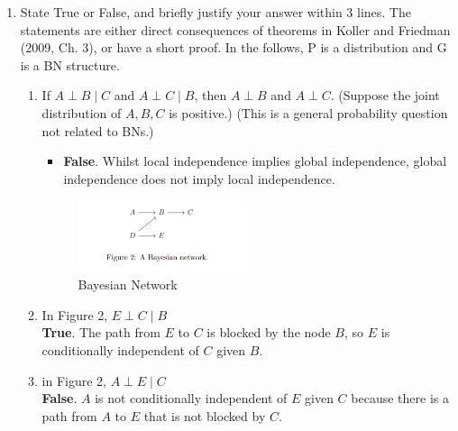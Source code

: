 \documentclass[a3paper,12pt]{extarticle} %
\begin{document}
\begin{enumerate}
\item  State True or False, and briefly justify your answer within 3 lines. The statements are either
direct consequences of theorems in Koller and Friedman (2009, Ch. 3), or have a short proof. In the
follows, P is a distribution and G is a BN structure.
\begin{enumerate}
    \item If \( A \perp B \mid C \) and \( A \perp C \mid B \), then \( A \perp B \) and \( A \perp C \). (Suppose the joint distribution of \( A, B, C \) is positive.) (This is a general probability question not related to BNs.)
    \begin{itemize}
        \item \textbf{False}. Whilst local independence implies global independence, global independence does not imply local independence.
    \end{itemize}
    \begin{figure}[h]
        \centering
        \includegraphics[width=0.5\textwidth]{bn2.png}
        \caption{Bayesian Network}
    \end{figure}
    \item In Figure 2, \(E \perp C \mid B\)
    \\ \textbf{True}. The path from \(E\) to \(C\) is blocked by the node \(B\), so \(E\) is conditionally independent of \(C\) given \(B\).
    \item in Figure 2, \(A \perp E \mid C\)
    \\ \textbf{False}. \(A\) is not conditionally independent of \(E\) given \(C\) because there is a path from \(A\) to \(E\) that is not blocked by \(C\).

\end{enumerate}
\end{enumerate}
\end{document}
